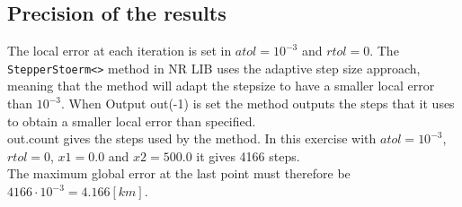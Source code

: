 \subsection{Precision of the results}
The local error at each iteration is set in $atol = 10^{-3}$ and $rtol = 0$. The \texttt{StepperStoerm<>} method in NR LIB uses the adaptive step size approach, meaning that the method will adapt the stepsize to have a smaller local error than $10^{-3}$.
When Output out(-1) is set the method outputs the steps that it uses to obtain a smaller local error than specified. \\
out.count gives the steps used by the method. In this exercise with $atol = 10^{-3}$, $rtol = 0$, $x1=0.0$ and $x2=500.0$ it gives 4166 steps.\\
The maximum global error at the last point must therefore be \\
$4166 \cdot 10^{-3} = 4.166  [km]$.
